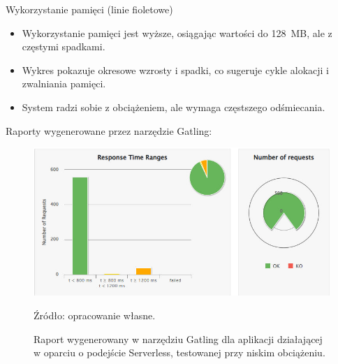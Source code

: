 \documentclass[runningheads,12pt]{llncs}
\begin{document}
Wykorzystanie pamięci (linie fioletowe)

\begin{itemize}
    \item Wykorzystanie pamięci jest wyższe, osiągając wartości do 128~MB, ale z częstymi spadkami.
    \item Wykres pokazuje okresowe wzrosty i spadki, co sugeruje cykle alokacji i zwalniania pamięci.
    \item System radzi sobie z obciążeniem, ale wymaga częstszego odśmiecania.
\end{itemize}


\newpage


Raporty wygenerowane przez narzędzie Gatling:

\begin{figure}
    \includegraphics[width=\linewidth]{images/serverless-gatling-low-graph.jpg}
    \caption{Raport wygenerowany w narzędziu Gatling dla aplikacji działającej w oparciu o podejście Serverless, testowanej przy niskim obciążeniu.} \label{fig1}
    \vspace{0.5em}
    {\small Źródło: opracowanie własne.}
\end{figure}
\end{document}
